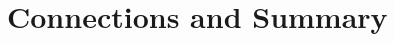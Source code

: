 \documentclass[aspectratio=169]{beamer}
\newif\ifanimated
\newcommand{\cpause}{\ifanimated\pause\fi}
\begin{document}





\section{Connections and Summary}

\begin{frame}[plain]
\sectionpage
\end{frame}
\end{document}
